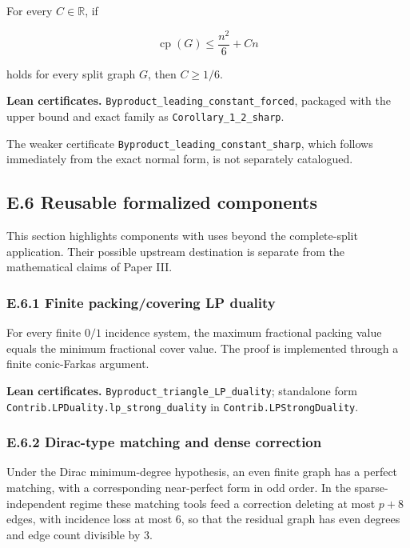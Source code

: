 \documentclass[
  american,
  11pt,
  a4paper,
]{article}
\begin{document}
For every \(C\in\mathbb R\), if

\[
\operatorname{cp}(G)\le \frac{n^2}{6}+Cn
\]

holds for every split graph \(G\), then \(C\ge1/6\).

\textbf{Lean certificates.} \texttt{Byproduct\_leading\_constant\_forced}, packaged with the upper bound and exact family as \texttt{Corollary\_1\_2\_sharp}.

The weaker certificate \texttt{Byproduct\_leading\_constant\_sharp}, which follows immediately from the exact normal form, is not separately catalogued.

\subsection{E.6 Reusable formalized components}\label{e.6-reusable-formalized-components}

This section highlights components with uses beyond the complete-split application. Their possible upstream destination is separate from the mathematical claims of Paper III.

\subsubsection{E.6.1 Finite packing/covering LP duality}\label{e.6.1-finite-packingcovering-lp-duality}

For every finite \(0/1\) incidence system, the maximum fractional packing value equals the minimum fractional cover value. The proof is implemented through a finite conic-Farkas argument.

\textbf{Lean certificates.} \texttt{Byproduct\_triangle\_LP\_duality}; standalone form \texttt{Contrib.LPDuality.lp\_strong\_duality} in \texttt{Contrib.LPStrongDuality}.

\subsubsection{E.6.2 Dirac-type matching and dense correction}\label{e.6.2-dirac-type-matching-and-dense-correction}

Under the Dirac minimum-degree hypothesis, an even finite graph has a perfect matching, with a corresponding near-perfect form in odd order. In the sparse-independent regime these matching tools feed a correction deleting at most \(p+8\) edges, with incidence loss at most \(6\), so that the residual graph has even degrees and edge count divisible by \(3\).
\end{document}
